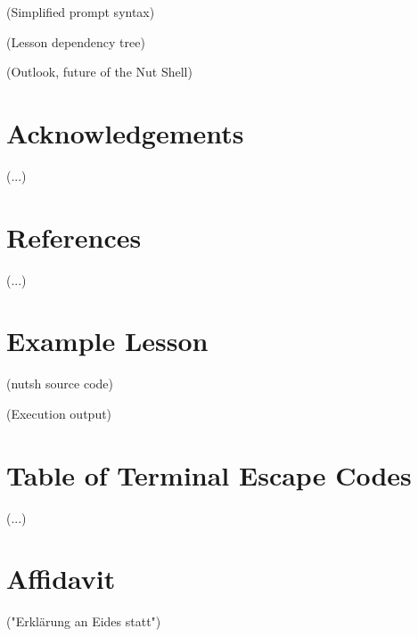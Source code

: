 \documentclass[twoside]{scrreprt}
\begin{document}
    (Simplified prompt syntax)

    (Lesson dependency tree)

(Outlook, future of the Nut Shell)

\chapter{Acknowledgements}

(...)

\chapter{References}

(...)

\appendix

\chapter{Example Lesson}

(nutsh source code)

(Execution output)

\chapter{Table of Terminal Escape Codes}

(...)

\chapter*{Affidavit}

("Erklärung an Eides statt")
\end{document}
